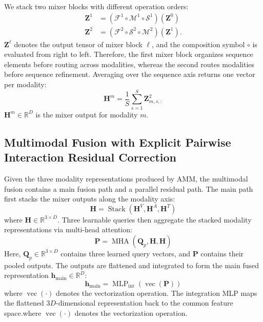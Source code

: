 \documentclass[letterpaper]{article} %
\begin{document}
We stack two mixer blocks with different operation orders:
\begin{equation}
\begin{aligned}
\mathbf{Z}^{1}
&=(\mathcal{F}^{1}\circ\mathcal{M}^{1}\circ\mathcal{S}^{1})
  (\mathbf{Z}^{0}) \\
\mathbf{Z}^{2}
&=(\mathcal{F}^{2}\circ\mathcal{S}^{2}\circ\mathcal{M}^{2})
  (\mathbf{Z}^{1}).
\end{aligned}
\label{eq:alternating_blocks}
\end{equation}
$\mathbf{Z}^{\ell}$ denotes the output tensor of mixer block $\ell$,
and the composition symbol $\circ$ is evaluated from right to left.
Therefore, the first mixer block organizes sequence elements before routing
across modalities, whereas the second routes modalities before sequence
refinement. Averaging over the sequence axis returns one vector per
modality:
\begin{equation}
\mathbf{H}^{m}=\frac{1}{S}\sum_{s=1}^{S}\mathbf{Z}^{2}_{m,s,:}
\label{eq:mixer_output}
\end{equation}
$\mathbf{H}^{m}\in\mathbb{R}^{D}$ is the mixer output for modality $m$.


\subsection{Multimodal Fusion with Explicit Pairwise Interaction Residual Correction}

Given the three modality representations produced by AMM, the
multimodal fusion contains a main fusion path and a parallel
residual path. The main path first stacks the mixer outputs along the
modality axis:
\begin{equation}
\mathbf{H}
=\operatorname{Stack}
  (\mathbf{H}^{V},
   \mathbf{H}^{A},
   \mathbf{H}^{T})
\label{eq:stacked_mixer_output}
\end{equation}
where $\mathbf{H}\in\mathbb{R}^{3\times D}$. Three learnable queries then aggregate the stacked modality representations via multi-head attention:
\begin{equation}
\mathbf{P}
=\operatorname{MHA}
  (\mathbf{Q}_{p},\mathbf{H},
   \mathbf{H})
\end{equation}
Here, $\mathbf{Q}_{p}\in\mathbb{R}^{3\times D}$ contains three learned
query vectors, and $\mathbf{P}$ contains their pooled outputs. The
outputs are flattened and integrated to form the main fused
representation $\mathbf{h}_{\mathrm{main}}\in\mathbb{R}^{D}$:
\begin{equation}
\mathbf{h}_{\mathrm{main}}
=\operatorname{MLP}_{\mathrm{int}}
  (\operatorname{vec}(\mathbf{P}))
\label{eq:main_fusion}
\end{equation}
where $\operatorname{vec}(\cdot)$ denotes the vectorization operation.
The integration MLP maps the flattened $3D$-dimensional representation
back to the common feature space.where $\operatorname{vec}(\cdot)$ denotes the vectorization operation.
\end{document}
